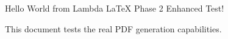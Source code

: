 \documentclass{article}
\begin{document}
Hello World from Lambda LaTeX Phase 2 Enhanced Test!

This document tests the real PDF generation capabilities.
\end{document}
